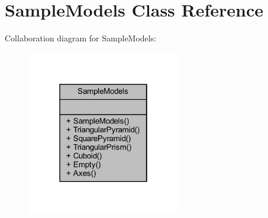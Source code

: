 \hypertarget{class_sample_models}{}\section{Sample\+Models Class Reference}
\label{class_sample_models}


Collaboration diagram for Sample\+Models\+:
\nopagebreak
\begin{figure}[H]
\begin{center}
\leavevmode
\includegraphics[width=190pt]{class_sample_models__coll__graph}
\end{center}
\end{figure}
